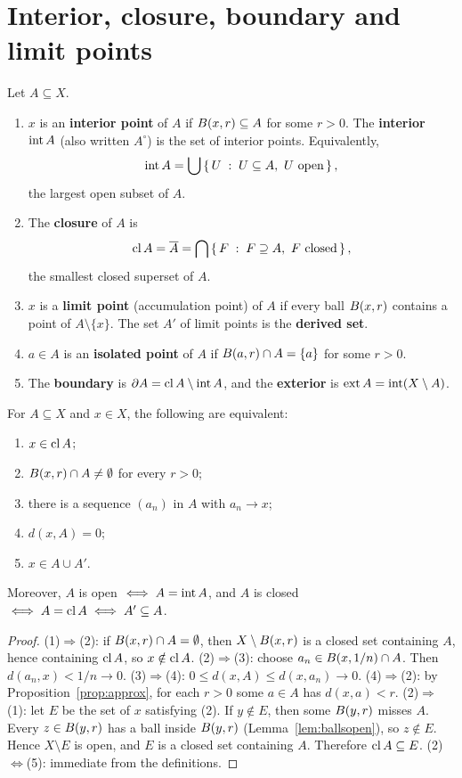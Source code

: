 \section{Interior, closure, boundary and limit points}
\begin{definition}\label{def:intcl}
Let $A\subseteq X$.
\begin{enumerate}[label=(\roman*)]
  \item $x$ is an \textbf{interior point} of $A$ if $B(x,r)\subseteq A$ for some $r>0$. The \textbf{interior} $\operatorname{int} A$ (also written $A^\circ$) is the set of interior points. Equivalently,
  \[ \operatorname{int} A=\bigcup\left\{\, U \;:\; U\subseteq A,\ U\text{ open} \,\right\}, \]
  the largest open subset of $A$.
  \item The \textbf{closure} of $A$ is
  \[ \operatorname{cl} A=\overline A=\bigcap\left\{\, F \;:\; F\supseteq A,\ F\text{ closed} \,\right\}, \]
  the smallest closed superset of $A$.
  \item $x$ is a \textbf{limit point} (accumulation point) of $A$ if every ball $B(x,r)$ contains a point of $A\setminus\{x\}$. The set $A'$ of limit points is the \textbf{derived set}.
  \item $a\in A$ is an \textbf{isolated point} of $A$ if $B(a,r)\cap A=\{a\}$ for some $r>0$.
  \item The \textbf{boundary} is $\partial A=\operatorname{cl} A\setminus\operatorname{int} A$, and the \textbf{exterior} is $\operatorname{ext} A=\operatorname{int}(X\setminus A)$.
\end{enumerate}
\end{definition}

\begin{theorem}\label{thm:closure}
For $A\subseteq X$ and $x\in X$, the following are equivalent:
\begin{enumerate}[label=(\arabic*)]
  \item $x\in\operatorname{cl} A$;
  \item $B(x,r)\cap A\ne\emptyset$ for every $r>0$;
  \item there is a sequence $(a_n)$ in $A$ with $a_n\to x$;
  \item $d(x,A)=0$;
  \item $x\in A\cup A'$.
\end{enumerate}
Moreover, $A$ is open $\iff A=\operatorname{int} A$, and $A$ is closed $\iff A=\operatorname{cl} A\iff A'\subseteq A$.
\end{theorem}
\begin{proof}
(1)$\Rightarrow$(2): if $B(x,r)\cap A=\emptyset$, then $X\setminus B(x,r)$ is a closed set containing $A$, hence containing $\operatorname{cl} A$, so $x\notin\operatorname{cl} A$.
(2)$\Rightarrow$(3): choose $a_n\in B(x,1/n)\cap A$. Then $d(a_n,x)<1/n\to0$.
(3)$\Rightarrow$(4): $0\le d(x,A)\le d(x,a_n)\to0$.
(4)$\Rightarrow$(2): by Proposition~\ref{prop:approx}, for each $r>0$ some $a\in A$ has $d(x,a)<r$.
(2)$\Rightarrow$(1): let $E$ be the set of $x$ satisfying (2). If $y\notin E$, then some $B(y,r)$ misses $A$. Every $z\in B(y,r)$ has a ball inside $B(y,r)$ (Lemma~\ref{lem:ballsopen}), so $z\notin E$. Hence $X\setminus E$ is open, and $E$ is a closed set containing $A$. Therefore $\operatorname{cl} A\subseteq E$.
(2)$\Leftrightarrow$(5): immediate from the definitions.
\end{proof}

